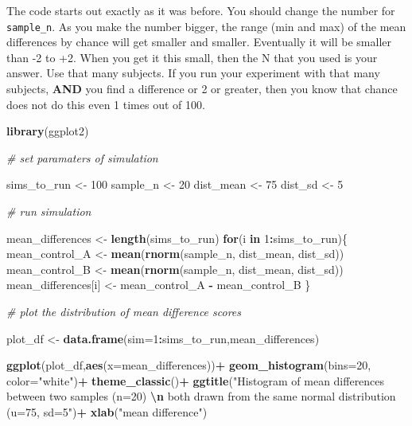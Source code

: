 \documentclass[
]{book}
\newenvironment{Shaded}{\begin{snugshade}}{\end{snugshade}}
\newcommand{\AttributeTok}[1]{\textcolor[rgb]{0.13,0.29,0.53}{#1}}
\newcommand{\CommentTok}[1]{\textcolor[rgb]{0.56,0.35,0.01}{\textit{#1}}}
\newcommand{\ControlFlowTok}[1]{\textcolor[rgb]{0.13,0.29,0.53}{\textbf{#1}}}
\newcommand{\DecValTok}[1]{\textcolor[rgb]{0.00,0.00,0.81}{#1}}
\newcommand{\FunctionTok}[1]{\textcolor[rgb]{0.13,0.29,0.53}{\textbf{#1}}}
\newcommand{\NormalTok}[1]{#1}
\newcommand{\OtherTok}[1]{\textcolor[rgb]{0.56,0.35,0.01}{#1}}
\newcommand{\SpecialCharTok}[1]{\textcolor[rgb]{0.81,0.36,0.00}{\textbf{#1}}}
\newcommand{\StringTok}[1]{\textcolor[rgb]{0.31,0.60,0.02}{#1}}
\begin{document}
The code starts out exactly as it was before. You should change the number for \texttt{sample\_n}. As you make the number bigger, the range (min and max) of the mean differences by chance will get smaller and smaller. Eventually it will be smaller than -2 to +2. When you get it this small, then the N that you used is your answer. Use that many subjects. If you run your experiment with that many subjects, \textbf{AND} you find a difference or 2 or greater, then you know that chance does not do this even 1 times out of 100.

\begin{Shaded}
\begin{Highlighting}[]
\FunctionTok{library}\NormalTok{(ggplot2)}

\CommentTok{\# set paramaters of simulation}

\NormalTok{sims\_to\_run }\OtherTok{\textless{}{-}} \DecValTok{100}
\NormalTok{sample\_n   }\OtherTok{\textless{}{-}} \DecValTok{20}
\NormalTok{dist\_mean  }\OtherTok{\textless{}{-}} \DecValTok{75}
\NormalTok{dist\_sd    }\OtherTok{\textless{}{-}} \DecValTok{5}

\CommentTok{\# run simulation}

\NormalTok{mean\_differences }\OtherTok{\textless{}{-}} \FunctionTok{length}\NormalTok{(sims\_to\_run)}
\ControlFlowTok{for}\NormalTok{(i }\ControlFlowTok{in} \DecValTok{1}\SpecialCharTok{:}\NormalTok{sims\_to\_run)\{}
\NormalTok{  mean\_control\_A      }\OtherTok{\textless{}{-}} \FunctionTok{mean}\NormalTok{(}\FunctionTok{rnorm}\NormalTok{(sample\_n, dist\_mean, dist\_sd))}
\NormalTok{  mean\_control\_B      }\OtherTok{\textless{}{-}} \FunctionTok{mean}\NormalTok{(}\FunctionTok{rnorm}\NormalTok{(sample\_n, dist\_mean, dist\_sd))}
\NormalTok{  mean\_differences[i] }\OtherTok{\textless{}{-}}\NormalTok{ mean\_control\_A }\SpecialCharTok{{-}}\NormalTok{ mean\_control\_B}
\NormalTok{\}}

\CommentTok{\# plot the  distribution of mean difference scores}

\NormalTok{plot\_df }\OtherTok{\textless{}{-}} \FunctionTok{data.frame}\NormalTok{(}\AttributeTok{sim=}\DecValTok{1}\SpecialCharTok{:}\NormalTok{sims\_to\_run,mean\_differences)}

\FunctionTok{ggplot}\NormalTok{(plot\_df,}\FunctionTok{aes}\NormalTok{(}\AttributeTok{x=}\NormalTok{mean\_differences))}\SpecialCharTok{+}
  \FunctionTok{geom\_histogram}\NormalTok{(}\AttributeTok{bins=}\DecValTok{20}\NormalTok{, }\AttributeTok{color=}\StringTok{"white"}\NormalTok{)}\SpecialCharTok{+}
  \FunctionTok{theme\_classic}\NormalTok{()}\SpecialCharTok{+}
  \FunctionTok{ggtitle}\NormalTok{(}\StringTok{"Histogram of mean differences between two samples (n=20) }\SpecialCharTok{\textbackslash{}n}
\StringTok{          both drawn from the same normal distribution (u=75, sd=5"}\NormalTok{)}\SpecialCharTok{+}
  \FunctionTok{xlab}\NormalTok{(}\StringTok{"mean difference"}\NormalTok{)}
\end{Highlighting}
\end{Shaded}
\end{document}
